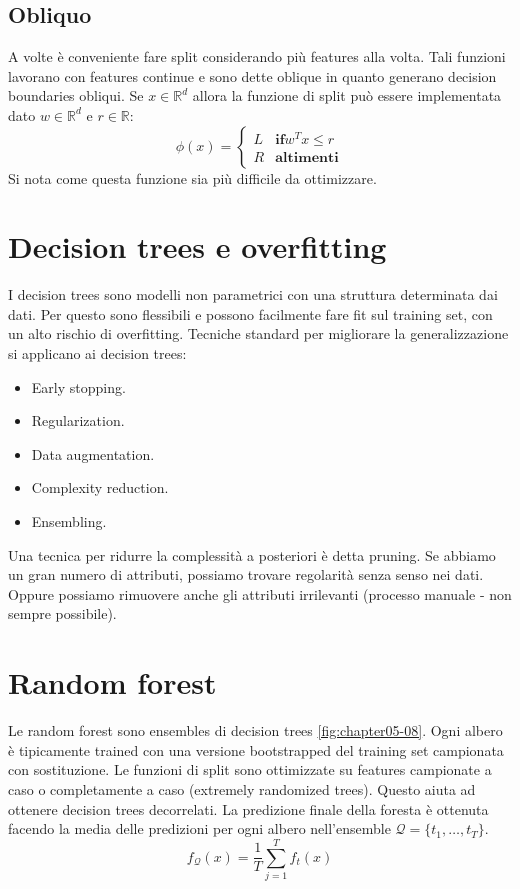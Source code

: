 	\subsection{Obliquo}
	A volte \`e conveniente fare split considerando pi\`u features alla volta.
	Tali funzioni lavorano con features continue e sono dette oblique in quanto generano decision boundaries obliqui.
	Se $x\in\mathbb{R}^d$ allora la funzione di split pu\`o essere implementata dato $w\in\mathbb{R}^d$ e $r\in\mathbb{R}$:
	$$\phi(x) = \begin{cases}L &\mathbf{if} w^Tx\le r\\
		 								  R &\mathbf{altimenti}
			 	\end{cases}$$
	Si nota come questa funzione sia pi\`u difficile da ottimizzare.

\section{Decision trees e overfitting}
I decision trees sono modelli non parametrici con una struttura determinata dai dati.
Per questo sono flessibili e possono facilmente fare fit sul training set, con un alto rischio di overfitting.
Tecniche standard per migliorare la generalizzazione si applicano ai decision trees:
\begin{multicols}{2}
	\begin{itemize}
		\item Early stopping.
		\item Regularization.
		\item Data augmentation.
		\item Complexity reduction.
		\item Ensembling.
	\end{itemize}
\end{multicols}
Una tecnica per ridurre la complessit\`a a posteriori \`e detta pruning.
Se abbiamo un gran numero di attributi, possiamo trovare regolarità senza senso nei dati. Oppure possiamo rimuovere anche gli attributi irrilevanti (processo manuale - non sempre possibile).

\section{Random forest}
Le random forest sono ensembles di decision trees \ref{fig:chapter05-08}.
Ogni albero \`e tipicamente trained con una versione bootstrapped del training set campionata con sostituzione.
Le funzioni di split sono ottimizzate su features campionate a caso o completamente a caso (extremely randomized trees).
Questo aiuta ad ottenere decision trees decorrelati.
La predizione finale della foresta \`e ottenuta facendo la media delle predizioni per ogni albero nell'ensemble $\mathcal{Q}=\{t_1,\dots,t_T\}$.
$$f_\mathcal{Q}(x)=\dfrac{1}{T}\sum\limits_{j=1}^Tf_t(x)$$

